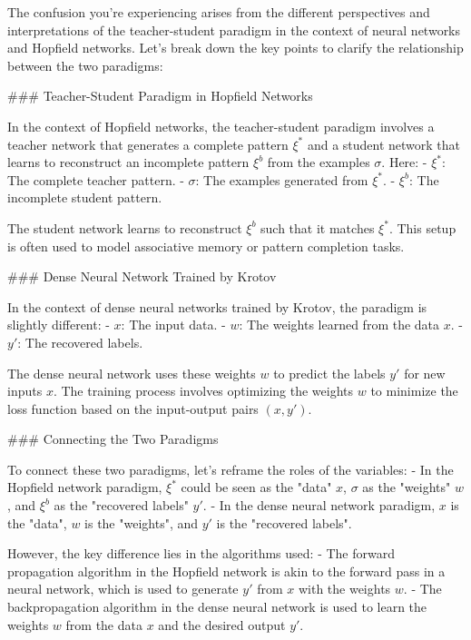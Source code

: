 The confusion you're experiencing arises from the different perspectives and interpretations of the teacher-student paradigm in the context of neural networks and Hopfield networks. Let's break down the key points to clarify the relationship between the two paradigms:

### Teacher-Student Paradigm in Hopfield Networks

In the context of Hopfield networks, the teacher-student paradigm involves a teacher network that generates a complete pattern \( \xi^* \) and a student network that learns to reconstruct an incomplete pattern \( \xi^b \) from the examples \( \sigma \). Here:
- \( \xi^* \): The complete teacher pattern.
- \( \sigma \): The examples generated from \( \xi^* \).
- \( \xi^b \): The incomplete student pattern.

The student network learns to reconstruct \( \xi^b \) such that it matches \( \xi^* \). This setup is often used to model associative memory or pattern completion tasks.

### Dense Neural Network Trained by Krotov

In the context of dense neural networks trained by Krotov, the paradigm is slightly different:
- \( x \): The input data.
- \( w \): The weights learned from the data \( x \).
- \( y' \): The recovered labels.

The dense neural network uses these weights \( w \) to predict the labels \( y' \) for new inputs \( x \). The training process involves optimizing the weights \( w \) to minimize the loss function based on the input-output pairs \( (x, y') \).

### Connecting the Two Paradigms

To connect these two paradigms, let's reframe the roles of the variables:
- In the Hopfield network paradigm, \( \xi^* \) could be seen as the "data" \( x \), \( \sigma \) as the "weights" \( w \), and \( \xi^b \) as the "recovered labels" \( y' \).
- In the dense neural network paradigm, \( x \) is the "data", \( w \) is the "weights", and \( y' \) is the "recovered labels".

However, the key difference lies in the algorithms used:
- The forward propagation algorithm in the Hopfield network is akin to the forward pass in a neural network, which is used to generate \( y' \) from \( x \) with the weights \( w \).
- The backpropagation algorithm in the dense neural network is used to learn the weights \( w \) from the data \( x \) and the desired output \( y' \).

